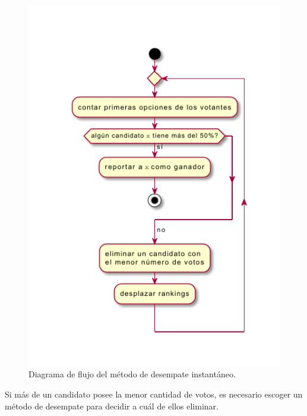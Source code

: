 \begin{figure}[!h]
    \centering
    \includegraphics[scale=1.4]{Graphics/irv.pdf}
    \caption{Diagrama de flujo del m\'etodo de desempate instant\'aneo.}
    \label{fig:irv}
\end{figure}

Si m\'as de un candidato posee la menor cantidad de votos, es necesario escoger un m\'etodo de desempate para decidir a cu\'al de ellos eliminar.

